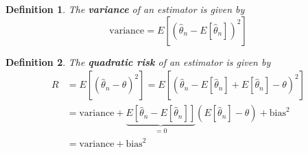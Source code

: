 \documentclass[10pt,a4paper]{article}
\newtheorem{definition}{Definition}
\newcommand{\htn}{\hat{\theta}_n}
\begin{document}
\begin{definition}
The \textbf{variance} of an estimator is given by\begin{equation}
\text{variance} = E \left[ (\hat \theta_n - E[\hat \theta_n])^2 \right]
\end{equation}
\end{definition}

\begin{definition}
The \textbf{quadratic risk} of an estimator is given by
\begin{align}
R &= E \left[ (\htn - \theta)^2 \right] = E \left[ (\hat \theta_n - E[\htn] + E[\htn] - \theta )^2  \right] \\
&=  \text{variance} + \underbrace{ E \left[ \hat \theta_n -
 E[\htn]  \right]}_{=0} (E[\htn] - \theta) + \text{bias}^2 \\
& = \text{variance} + \text{bias}^2
\end{align}
\end{definition}
\end{document}
